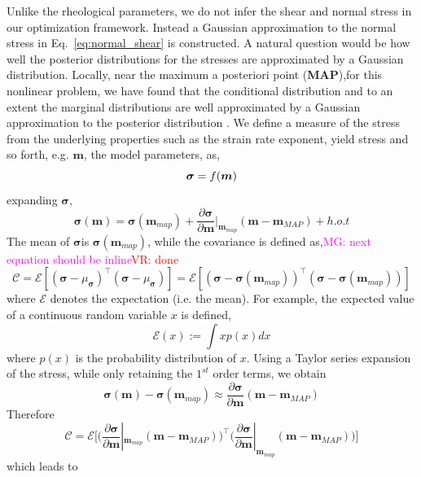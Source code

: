 \documentclass[12pt]{article}
\newcommand{\mgnote}[1]{\textcolor{magenta}{MG: #1}}
\newcommand{\vrnote}[1]{\textcolor{red}{VR: #1}}
\newcommand{\mm}{{\ensuremath{\boldsymbol{m}}}}
\newcommand{\ssigma}{{\ensuremath{\boldsymbol{\sigma}}}}
\begin{document}
{Unlike the rheological parameters, we do not infer the shear and normal stress in our optimization framework. Instead a Gaussian approximation to the normal stress in Eq.~\eqref{eq:normal_shear} is constructed. A natural question would be how well the posterior distributions for the stresses are approximated by a Gaussian distribution. Locally, near the maximum a posteriori point (\textbf{MAP}),for this nonlinear problem, we have found that the conditional distribution and to an extent the marginal distributions are well approximated by a Gaussian approximation to the posterior distribution \citep{ratnaswamy2015adjoint}.  We define a measure of the stress from the underlying properties such as the strain rate exponent, yield stress and so forth, e.g. $\mm$, the model parameters, as, 
\begin{equation}
\textit \ssigma = f(\mm)
\end{equation}
expanding $\ssigma$,
\begin{equation}
\ssigma (\mm) = \ssigma(\mm_{map}) + \frac{\partial\ssigma}{\partial \mm}|_{\mm_{map}} (\mm-\mm_{MAP}) + h.o.t
\end{equation}
The mean of \ssigma is $\ssigma(\mm_{map})$, while the covariance is defined as,\mgnote{next equation should be inline}\vrnote{done}
\begin{equation}
\mathcal C = \mathcal E[(\ssigma-\mu_{\ssigma})^\intercal(\ssigma-\mu_{\ssigma})]  = \mathcal E[(\ssigma-\ssigma(\mm_{map}))^\intercal(\ssigma-\ssigma(\mm_{map}))]
\end{equation}
where $\mathcal E$ denotes the expectation (i.e. the mean). For example, the expected value of a continuous random variable $x$ is defined,
\begin{equation}
\mathcal E(x):= \int x p(x) dx
\end{equation}
where $p(x)$ is the probability distribution of $x$.
Using a Taylor series expansion of the  stress, while only retaining the $1^{st}$ order terms, we obtain
\begin{equation}
\ssigma (\mm) -\ssigma(\mm_{map}) \approx \frac{\partial\ssigma}{\partial \mm} (\mm-\mm_{MAP})
\end{equation}
Therefore
\begin{equation}
\mathcal C = \mathcal E\big[\big(\frac{\partial\ssigma}{\partial \mm}|_{\mm_{map}} (\mm-\mm_{MAP})\big)^\intercal\big(\frac{\partial\ssigma}{\partial \mm}|_{\mm_{map}} (\mm-\mm_{MAP})\big)\big]
\end{equation}
which leads to
\begin{equation}

\end{equation}}
\end{document}
